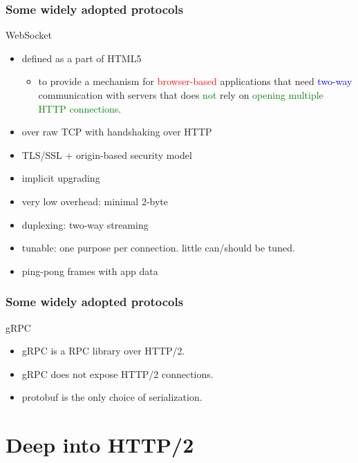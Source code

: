 \documentclass[lualatex]{beamer}
\begin{document}
\begin{frame}
  \frametitle{Some widely adopted protocols}

  \begin{block}{WebSocket}
    \begin{itemize}
    \item defined as a part of HTML5
      \begin{itemize}
      \item to provide a mechanism for \textcolor{red}{browser-based} applications that need \textcolor{blue}{two-way} communication with servers that does \textcolor{green}{not} rely on \textcolor{green}{opening multiple HTTP connections}.
      \end{itemize}
    \item over raw TCP with handshaking over HTTP
    \item TLS/SSL + origin-based security model
    \item implicit upgrading
    \item very low overhead: minimal 2-byte
    \item duplexing: two-way streaming
    \item tunable: one purpose per connection. little can/should be tuned.
    \item ping-pong frames with app data
    \end{itemize}
  \end{block}
\end{frame}

\begin{frame}
  \frametitle{Some widely adopted protocols}

  \begin{block}{gRPC}
    \begin{itemize}
    \item gRPC is a RPC library over HTTP/2.
    \item gRPC does not expose HTTP/2 connections.
    \item protobuf is the only choice of serialization.
    \end{itemize}
  \end{block}
\end{frame}

\section{Deep into HTTP/2}
\end{document}
